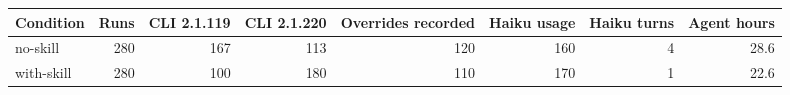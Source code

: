 \begin{tabular}{lrrrrrrr}
\toprule
Condition & Runs & CLI 2.1.119 & CLI 2.1.220 & Overrides recorded & Haiku usage & Haiku turns & Agent hours \\
\midrule
no-skill & 280 & 167 & 113 & 120 & 160 & 4 & 28.6 \\
with-skill & 280 & 100 & 180 & 110 & 170 & 1 & 22.6 \\
\bottomrule
\end{tabular}
